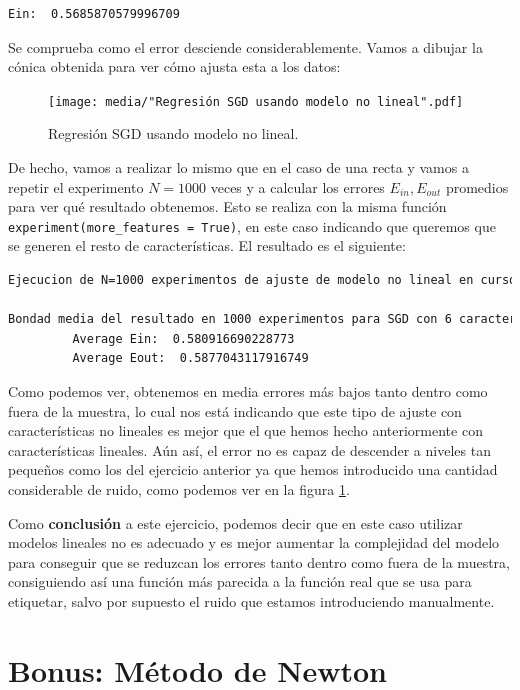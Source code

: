 \documentclass[12pt]{scrartcl}
\begin{document}
{\begin{lstlisting}[language=bash]
        Ein:  0.5685870579996709
\end{lstlisting}

Se comprueba como el error desciende considerablemente. Vamos a dibujar la cónica obtenida para ver cómo ajusta esta a los datos:
\begin{figure}[H]
  
  \centering
  \texttt{[image: media/"Regresión SGD usando modelo no lineal".pdf]}
  \caption{Regresión SGD usando modelo no lineal.}
  \label{fig:no-lin}
\end{figure}

De hecho, vamos a realizar lo mismo que en el caso de una recta y vamos a repetir el experimento $N=1000$ veces y a calcular los errores $E_{in}, E_{out}$ promedios para ver qué resultado obtenemos. Esto se realiza
con la misma función \lstinline{experiment(more_features = True)}, en este caso indicando que queremos que se generen el resto de características. El resultado es el siguiente:

\begin{lstlisting}[language=bash]
Ejecucion de N=1000 experimentos de ajuste de modelo no lineal en curso ...

Bondad media del resultado en 1000 experimentos para SGD con 6 características
         Average Ein:  0.580916690228773
         Average Eout:  0.5877043117916749
\end{lstlisting}

Como podemos ver, obtenemos en media errores más bajos tanto dentro como fuera de la muestra, lo cual nos está indicando que este tipo de ajuste con características no lineales
es mejor que el que hemos hecho anteriormente con características lineales. Aún así, el error no es capaz de descender a niveles tan pequeños como los del ejercicio anterior ya que
hemos introducido una cantidad considerable de ruido, como podemos ver en la figura \ref{fig:no-lin}.

Como \textbf{conclusión} a este ejercicio, podemos decir que en este caso utilizar modelos lineales no es adecuado y es mejor aumentar la complejidad del modelo para conseguir que se reduzcan 
los errores tanto dentro como fuera de la muestra, consiguiendo así una función más parecida a la función real que se usa para etiquetar, salvo por supuesto el ruido que estamos introduciendo manualmente.

\newpage

\section*{Bonus: Método de Newton}

}
\end{document}
